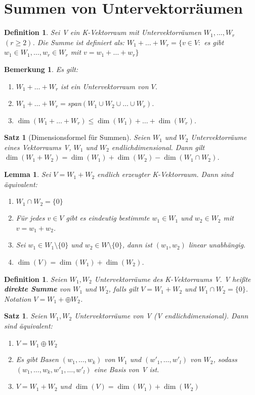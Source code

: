 \documentclass[12pt,a4paper]{article}
\theoremstyle{plain}
\newtheorem{Satz}[Theorem]{Satz}
\newtheorem{Lemma}[Theorem]{Lemma}
\newtheorem{Definition}[Theorem]{Definition}
\newtheorem{Bemerkung}[Theorem]{Bemerkung}
\newcommand{\herv}[1]{{\emph{\textbf{#1}}}}
\numberwithin{equation}{section}
\begin{document}
\section{Summen von Untervektorräumen}
\begin{Definition}
Sei V ein K-Vektorraum mit Untervektorräumen $W_1,\ldots,W_r$ $(r\geq 2)$. Die Summe ist definiert als: $W_1+\ldots+W_r=\{v\in V:$ es gibt $w_1\in W_1,\ldots, w_r\in W_r$ mit $v=w_1+\ldots+w_r\}$
\end{Definition}
\begin{Bemerkung}
Es gilt: \begin{enumerate}
\renewcommand{\labelenumi}{\alph{enumi})}
\item $W_1+\ldots+W_r$ ist ein Untervektorraum von $V$.
\item $W_1+\ldots+W_r=$span$(W_1\cup W_2\cup \ldots \cup W_r)$.
\item $\dim(W_1+\ldots+W_r)\leq \dim(W_1)+\ldots+\dim(W_r)$.
\end{enumerate}
\end{Bemerkung}
\begin{Satz}[Dimensionsformel für Summen]
Seien $W_1$ und $W_2$ Untervektorräume eines Vektorraums V, $W_1$ und $W_2$ endlichdimensional. Dann gilt $\dim(W_1+W_2)=\dim(W_1)+\dim(W_2)-\dim(W_1\cap W_2)$.
\end{Satz}
\begin{Lemma}
Sei $V=W_1+W_2$ endlich erzeugter K-Vektorraum. Dann sind äquivalent: \begin{enumerate}
\renewcommand{\labelenumi}{\emph{(\roman{enumi})}}
\item $W_1\cap W_2=\{0\}$
\item Für jedes $v\in V$ gibt es eindeutig bestimmte $w_1\in W_1$ und $w_2\in W_2$ mit $v=w_1+w_2$.
\item Sei $w_1 \in W_1\setminus\{0\}$ und $w_2\in W\setminus\{0\}$, dann ist $(w_1,w_2)$ linear unabhängig.
\item $\dim(V)=\dim(W_1)+\dim(W_2)$.
\end{enumerate}
\end{Lemma}
\begin{Definition}
Seien $W_1, W_2$ Untervektorräume des K-Vektorraums V. V heißte \herv{direkte Summe} von $W_1$ und $W_2$, falls gilt $V=W_1+W_2$ und $W_1\cap W_2=\{0\}$. Notation $V=W_1+\oplus W_2$.
\end{Definition}
\begin{Satz}
Seien $W_1, W_2$ Untervektorräume von V (V endlichdimensional). Dann sind äquivalent:
\begin{enumerate}
\renewcommand{\labelenumi}{\emph{(\roman{enumi})}}
\item $V=W_1\oplus W_2$
\item Es gibt Basen $(w_1,\ldots,w_k)$ von $W_1$ und $(w'_1,\ldots,w'_l)$ von $W_2$, sodass $(w_1,\ldots,w_k,w'_1,\ldots,w'_l)$ eine Basis von V ist.
\item $V=W_1+W_2$ und $\dim(V)=\dim(W_1)+\dim(W_2)$
\end{enumerate}
\end{Satz}
\end{document}
